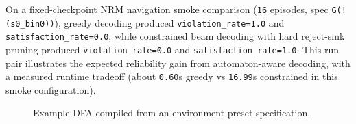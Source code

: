 \documentclass[runningheads]{llncs}
\begin{document}
On a fixed-checkpoint NRM navigation smoke comparison (\texttt{16} episodes, spec \texttt{G(!(s0\_bin0))}), greedy decoding produced \texttt{violation\_rate=1.0} and \texttt{satisfaction\_rate=0.0}, while constrained beam decoding with hard reject-sink pruning produced \texttt{violation\_rate=0.0} and \texttt{satisfaction\_rate=1.0}. This run pair illustrates the expected reliability gain from automaton-aware decoding, with a measured runtime tradeoff (about \texttt{0.60}s greedy vs \texttt{16.99}s constrained in this smoke configuration).

\begin{figure}[t]
\centering
{}
\caption{Example DFA compiled from an environment preset specification.}
\label{fig:dfa_inspection}
\end{figure}
\end{document}
